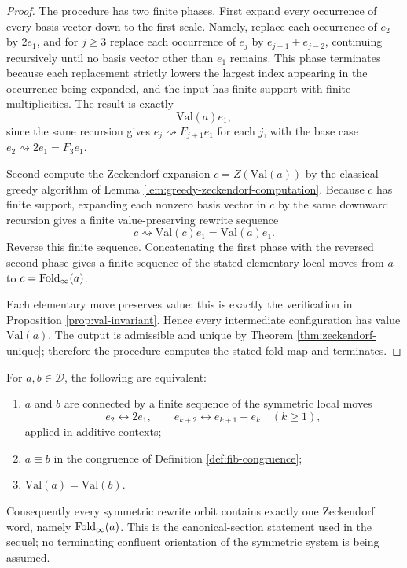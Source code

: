\begin{proof}
The procedure has two finite phases. First expand every occurrence of every basis vector down to the first scale. Namely, replace each occurrence of \(e_2\) by \(2e_1\), and for \(j\ge 3\) replace each occurrence of \(e_j\) by \(e_{j-1}+e_{j-2}\), continuing recursively until no basis vector other than \(e_1\) remains. This phase terminates because each replacement strictly lowers the largest index appearing in the occurrence being expanded, and the input has finite support with finite multiplicities. The result is exactly
\[
\mathrm{Val}(a)e_1,
\]
since the same recursion gives \(e_j\rightsquigarrow F_{j+1}e_1\) for each \(j\), with the base case \(e_2\rightsquigarrow 2e_1=F_3e_1\).

Second compute the Zeckendorf expansion \(c=Z(\mathrm{Val}(a))\) by the classical greedy algorithm of Lemma \ref{lem:greedy-zeckendorf-computation}. Because \(c\) has finite support, expanding each nonzero basis vector in \(c\) by the same downward recursion gives a finite value-preserving rewrite sequence
\[
c\rightsquigarrow \mathrm{Val}(c)e_1=\mathrm{Val}(a)e_1.
\]
Reverse this finite sequence. Concatenating the first phase with the reversed second phase gives a finite sequence of the stated elementary local moves from \(a\) to \(c=\operatorname{Fold}_\infty(a)\).

Each elementary move preserves value: this is exactly the verification in Proposition \ref{prop:val-invariant}. Hence every intermediate configuration has value \(\mathrm{Val}(a)\). The output is admissible and unique by Theorem \ref{thm:zeckendorf-unique}; therefore the procedure computes the stated fold map and terminates.
\end{proof}

\begin{theorem}\label{thm:symmetric-rewrite-orbits-value-fibers}
For \(a,b\in\mathcal{D}\), the following are equivalent:
\begin{enumerate}[label=\textup{(\roman*)}]
  \item \(a\) and \(b\) are connected by a finite sequence of the symmetric local moves
\[
e_2\longleftrightarrow 2e_1,
\qquad
e_{k+2}\longleftrightarrow e_{k+1}+e_k\quad(k\ge 1),
\]
applied in additive contexts;
  \item \(a\equiv b\) in the congruence of Definition \ref{def:fib-congruence};
  \item \(\mathrm{Val}(a)=\mathrm{Val}(b)\).
\end{enumerate}
Consequently every symmetric rewrite orbit contains exactly one Zeckendorf word, namely \(\operatorname{Fold}_\infty(a)\). This is the canonical-section statement used in the sequel; no terminating confluent orientation of the symmetric system is being assumed.
\end{theorem}

